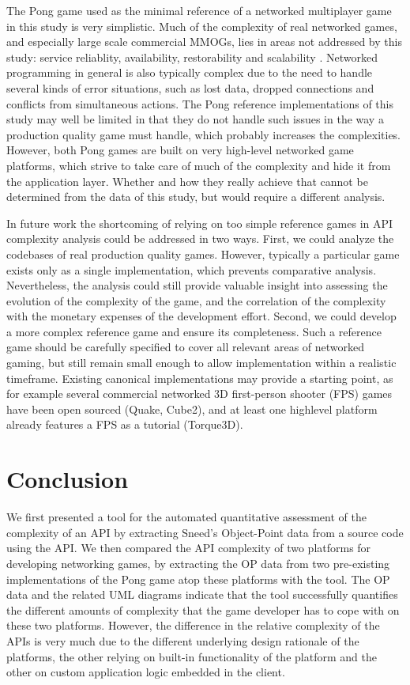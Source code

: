 \documentclass[conference]{IEEEtran}
\begin{document}
The Pong game used as the minimal reference of a networked multiplayer
game in this study is very simplistic. Much of the complexity of real
networked games, and especially large scale commercial MMOGs, lies in
areas not addressed by this study: service reliablity, availability,
restorability and scalability \cite{middleware}. Networked programming in
general is also typically complex due to the need to handle several
kinds of error situations, such as lost data, dropped connections and
conflicts from simultaneous actions. The Pong reference
implementations of this study may well be limited in that they do not
handle such issues in the way a production quality game must handle,
which probably increases the complexities. However, both Pong games
are built on very high-level networked game platforms, which strive to
take care of much of the complexity and hide it from the application
layer. Whether and how they really achieve that cannot be determined
from the data of this study, but would require a different analysis.

In future work the shortcoming of relying on too simple reference
games in API complexity analysis could be addressed in two
ways. First, we could analyze the codebases of real production quality
games. However, typically a particular game exists only as a single
implementation, which prevents comparative analysis. Nevertheless, the
analysis could still provide valuable insight into assessing the
evolution of the complexity of the game, and the correlation of the
complexity with the monetary expenses of the development
effort. Second, we could develop a more complex reference game and
ensure its completeness. Such a reference game should be carefully
specified to cover all relevant areas of networked gaming, but still
remain small enough to allow implementation within a realistic
timeframe. Existing canonical implementations may provide a starting
point, as for example several commercial networked 3D first-person
shooter (FPS) games have been open sourced (Quake, Cube2), and at
least one highlevel platform already features a FPS as a tutorial
(Torque3D).


\section{Conclusion%
  \label{conclusion}%
}

We first presented a tool for the automated quantitative assessment of
the complexity of an API by extracting Sneed’s Object-Point data from
a source code using the API. We then compared the API complexity of
two platforms for developing networking games, by extracting the OP
data from two pre-existing implementations of the Pong game atop these
platforms with the tool. The OP data and the related UML diagrams
indicate that the tool successfully quantifies the different amounts
of complexity that the game developer has to cope with on these two
platforms. However, the difference in the relative complexity of the
APIs is very much due to the different underlying design rationale of
the platforms, the other relying on built-in functionality of the
platform and the other on custom application logic embedded in the
client.
\end{document}
